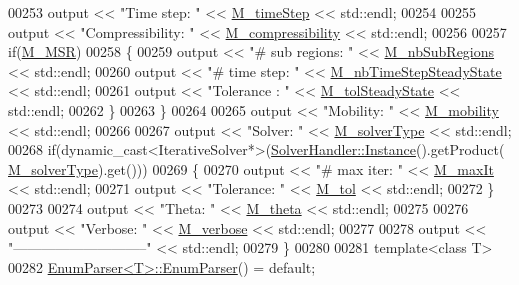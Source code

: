 \begin{DoxyCode}
00253         output << \textcolor{stringliteral}{"Time step: "} << \hyperlink{classFVCode3D_1_1Data_a10e4abb864d8f95f89fd468a2a328d45}{M\_timeStep} << std::endl;
00254 
00255         output << \textcolor{stringliteral}{"Compressibility: "} << \hyperlink{classFVCode3D_1_1Data_a8fc9be504e0a36500d75f1991d95caaa}{M\_compressibility} << std::endl;
00256 
00257         \textcolor{keywordflow}{if}(\hyperlink{classFVCode3D_1_1Data_a79a937025567c594d491124fdd7371d1}{M\_MSR})
00258         \{
00259             output << \textcolor{stringliteral}{"# sub regions: "} << \hyperlink{classFVCode3D_1_1Data_a939f25d917c0fc4cc307727f0161818d}{M\_nbSubRegions} << std::endl;
00260             output << \textcolor{stringliteral}{"# time step: "} << \hyperlink{classFVCode3D_1_1Data_a89795eb2a12c28f1f919c3148c44556e}{M\_nbTimeStepSteadyState} << std::endl;
00261             output << \textcolor{stringliteral}{"Tolerance : "} << \hyperlink{classFVCode3D_1_1Data_a985779d5af3b0a0cdee095d599f4edc5}{M\_tolSteadyState} << std::endl;
00262         \}
00263     \}
00264 
00265     output << \textcolor{stringliteral}{"Mobility: "} << \hyperlink{classFVCode3D_1_1Data_ace221dee0530a79694fbc1d2beca96ac}{M\_mobility} << std::endl;
00266 
00267     output << \textcolor{stringliteral}{"Solver: "} << \hyperlink{classFVCode3D_1_1Data_a38b6dc5c0b7c6f4734be7b60b231e56b}{M\_solverType} << std::endl;
00268     \textcolor{keywordflow}{if}(dynamic\_cast<IterativeSolver*>(\hyperlink{classFVCode3D_1_1SolverHandler_ada712461029e9fdf623260937afe4da3}{SolverHandler::Instance}().getProduct(
      \hyperlink{classFVCode3D_1_1Data_a38b6dc5c0b7c6f4734be7b60b231e56b}{M\_solverType}).\textcolor{keyword}{get}()))
00269     \{
00270         output << \textcolor{stringliteral}{"# max iter: "} << \hyperlink{classFVCode3D_1_1Data_a2691a1563c9a9d1f9fa991acac368c6a}{M\_maxIt} << std::endl;
00271         output << \textcolor{stringliteral}{"Tolerance: "} << \hyperlink{classFVCode3D_1_1Data_a00dd1282e39bfdf77368f3c79382c5c4}{M\_tol} << std::endl;
00272     \}
00273 
00274     output << \textcolor{stringliteral}{"Theta: "} << \hyperlink{classFVCode3D_1_1Data_a984e97d7d25e882ba1b089b3d82f78c3}{M\_theta} << std::endl;
00275 
00276     output << \textcolor{stringliteral}{"Verbose: "} << \hyperlink{classFVCode3D_1_1Data_abce1861779ec036fc587fb69a7fe8c6c}{M\_verbose} << std::endl;
00277 
00278     output << \textcolor{stringliteral}{"-----------------------------"} << std::endl;
00279 \}
00280 
00281 \textcolor{keyword}{template}<\textcolor{keyword}{class} T>
00282 \hyperlink{classFVCode3D_1_1EnumParser_a9aea725005dd5c0a0f69be19af1a4de0}{EnumParser<T>::EnumParser}() = \textcolor{keywordflow}{default};

\end{DoxyCode}
